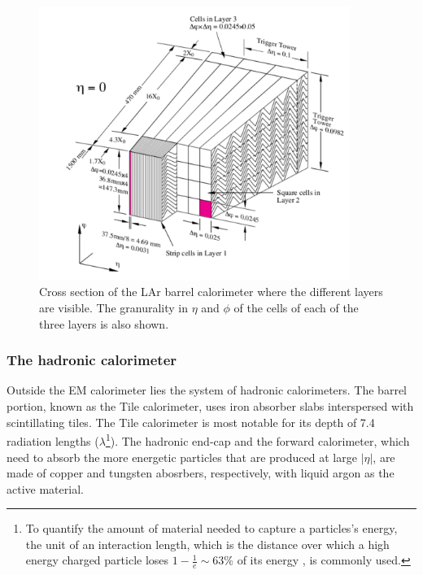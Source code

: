 \begin{figure}[htbp]
  \begin{center}
      \includegraphics[width=0.9\textwidth]{Fig2/EM_acordionstructure.pdf}
    \caption{Cross section of the LAr barrel calorimeter where the different layers are visible. The granurality in $\eta$ and $\phi$ of the cells of each of the three layers is also shown.}
    \label{fig:EMacordion}
  \end{center}
\end{figure}



\subsubsection{The hadronic calorimeter}


Outside the EM calorimeter lies the system of hadronic calorimeters. The barrel portion, known as the Tile calorimeter, uses iron absorber slabs interspersed with scintillating tiles. The Tile calorimeter is most notable for its depth of 7.4 radiation lengths ($\lambda$\footnote{To quantify the amount of material needed to capture a particles's energy, the unit of an interaction length, which is the distance over which a high energy charged particle loses $1-\frac{1}{e}\sim 63$\% of its energy , is commonly used.}). The hadronic end-cap and the forward calorimeter, which need to absorb the more energetic particles that are produced at large $|\eta|$, are made of copper and tungsten abosrbers, respectively, with liquid argon as the active material.


